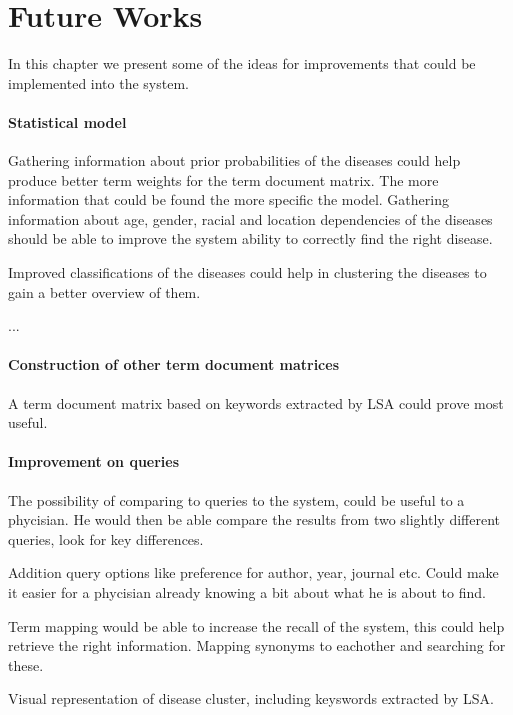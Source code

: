 \chapter{Future Works\label{FutureWorks}}

In this chapter we present some of the ideas for improvements that could be implemented into the system.

\subsubsection{Statistical model}
Gathering information about prior probabilities of the diseases could
help produce better term weights for the term document matrix. The
more information that could be found the more specific the
model. Gathering information about age, gender, racial and location
dependencies of the diseases should be able to improve the system
ability to correctly find the right disease.

Improved classifications of the diseases could help in clustering the
diseases to gain a better overview of them.

 ... 

\subsubsection{Construction of other term document matrices}
A term document matrix based on keywords extracted by LSA could prove
most useful.

\subsubsection{Improvement on queries}
The possibility of comparing to queries to the system, could be useful
to a phycisian. He would then be able compare the results from two
slightly different queries, look for key differences.

Addition query options like preference for author, year, journal
etc. Could make it easier for a phycisian already knowing a bit about
what he is about to find.

Term mapping would be able to increase the recall of the system, this
could help retrieve the right information. Mapping synonyms to
eachother and searching for these.

Visual representation of disease cluster, including keyswords
extracted by LSA.

